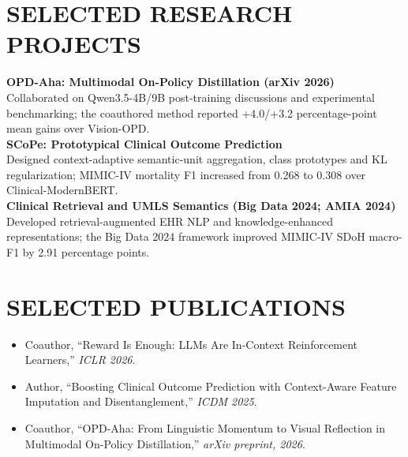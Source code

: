 \documentclass[10pt, letterpaper]{article}
\begin{document}
\section{SELECTED RESEARCH PROJECTS}
\textbf{OPD-Aha: Multimodal On-Policy Distillation (arXiv 2026)}\\[-1pt]
Collaborated on Qwen3.5-4B/9B post-training discussions and experimental benchmarking; the coauthored method reported +4.0/+3.2 percentage-point mean gains over Vision-OPD.\\[3pt]
\textbf{SCoPe: Prototypical Clinical Outcome Prediction}\\[-1pt]
Designed context-adaptive semantic-unit aggregation, class prototypes and KL regularization; MIMIC-IV mortality F1 increased from 0.268 to 0.308 over Clinical-ModernBERT.\\[3pt]
\textbf{Clinical Retrieval and UMLS Semantics (Big Data 2024; AMIA 2024)}\\[-1pt]
Developed retrieval-augmented EHR NLP and knowledge-enhanced representations; the Big Data 2024 framework improved MIMIC-IV SDoH macro-F1 by 2.91 percentage points.\\[3pt]
\section{SELECTED PUBLICATIONS}
\begin{itemize}
\item Coauthor, ``Reward Is Enough: LLMs Are In-Context Reinforcement Learners,'' \textit{ICLR 2026}.
\item Author, ``Boosting Clinical Outcome Prediction with Context-Aware Feature Imputation and Disentanglement,'' \textit{ICDM 2025}.
\item Coauthor, ``OPD-Aha: From Linguistic Momentum to Visual Reflection in Multimodal On-Policy Distillation,'' \textit{arXiv preprint, 2026}.
\end{itemize}
\end{document}
